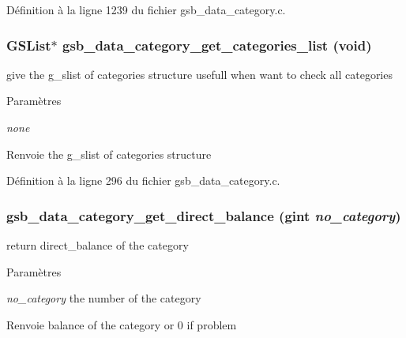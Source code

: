 Définition à la ligne 1239 du fichier gsb\_\-data\_\-category.c.

\subsubsection[{gsb\_\-data\_\-category\_\-get\_\-categories\_\-list}]{\setlength{\rightskip}{0pt plus 5cm}GSList$\ast$ gsb\_\-data\_\-category\_\-get\_\-categories\_\-list (void)}\label{gsb__data__category_8c_a818774b4775a516ebcffe7bbea3fbaeb}
give the g\_\-slist of categories structure usefull when want to check all categories


\begin{DoxyParams}{Paramètres}
\item[{\em none}]\end{DoxyParams}
\begin{DoxyReturn}{Renvoie}
the g\_\-slist of categories structure 
\end{DoxyReturn}


Définition à la ligne 296 du fichier gsb\_\-data\_\-category.c.

\subsubsection[{gsb\_\-data\_\-category\_\-get\_\-direct\_\-balance}]{ gsb\_\-data\_\-category\_\-get\_\-direct\_\-balance (gint {\em no\_\-category})}\label{gsb__data__category_8c_ab0bd6098046498d7d3de366ffc6dd177}
return direct\_\-balance of the category


\begin{DoxyParams}{Paramètres}
\item[{\em no\_\-category}]the number of the category\end{DoxyParams}
\begin{DoxyReturn}{Renvoie}
balance of the category or 0 if problem 
\end{DoxyReturn}


